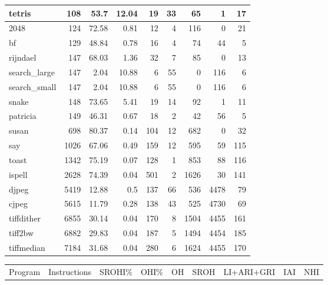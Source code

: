 \begin{tabular}{l|r|r|r|r|r|r|rr}
\hline
 tetris          &      108 &    53.7  &  12.04 &   19 &   33 &     65 &     1 &    17 \\
\hline
 2048            &      124 &    72.58 &   0.81 &   12 &    4 &    116 &     0 &    21 \\
\hline
 bf              &      129 &    48.84 &   0.78 &   16 &    4 &     74 &    44 &     5 \\
\hline
 rijndael        &      147 &    68.03 &   1.36 &   32 &    7 &     85 &     0 &    13 \\
\hline
 search\_large    &      147 &     2.04 &  10.88 &    6 &   55 &      0 &   116 &     6 \\
\hline
 search\_small    &      147 &     2.04 &  10.88 &    6 &   55 &      0 &   116 &     6 \\
\hline
 snake           &      148 &    73.65 &   5.41 &   19 &   14 &     92 &     1 &    11 \\
\hline
 patricia        &      149 &    46.31 &   0.67 &   18 &    2 &     42 &    56 &     5 \\
\hline
 susan           &      698 &    80.37 &   0.14 &  104 &   12 &    682 &     0 &    32 \\
\hline
 say             &     1026 &    67.06 &   0.49 &  159 &   12 &    595 &    59 &   115 \\
\hline
 toast           &     1342 &    75.19 &   0.07 &  128 &    1 &    853 &    88 &   116 \\
\hline
 ispell          &     2628 &    74.39 &   0.04 &  501 &    2 &   1626 &    30 &   141 \\
\hline
 djpeg           &     5419 &    12.88 &   0.5  &  137 &   66 &    536 &  4478 &    79 \\
\hline
 cjpeg           &     5615 &    11.79 &   0.28 &  138 &   43 &    525 &  4730 &    69 \\
\hline
 tiffdither      &     6855 &    30.14 &   0.04 &  170 &    8 &   1504 &  4455 &   161 \\
\hline
 tiff2bw         &     6882 &    29.83 &   0.04 &  187 &    5 &   1494 &  4454 &   185 \\
\hline
 tiffmedian      &     7184 &    31.68 &   0.04 &  280 &    6 &   1624 &  4455 &   170 \\
\hline
\end{tabular}\begin{tabular}{l|r|r|r|r|r|r|r|r}
\hline
 Program         &   Instructions &   SROHI\% &   OHI\% &   OH &   SROH &   LI+ARI+GRI &   IAI &   NHI \\

\end{tabular}
